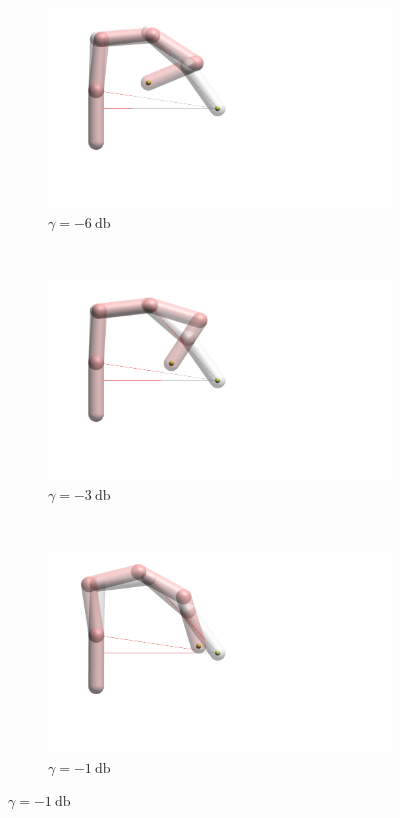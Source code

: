 \begin{figure}[h]
    \centering
    \begin{subfigure}[b]{.3\textwidth}
        \includegraphics[width=\textwidth]{Figures/distortions/distortions-6.png}
        \caption{$\gamma = \SI{-6}{\decibel}$}
    \end{subfigure}
    ~
    \begin{subfigure}[b]{.3\textwidth}
        \includegraphics[width=\textwidth]{Figures/distortions/distortions-3.png}
        \caption{$\gamma = \SI{-3}{\decibel}$}
    \end{subfigure}
    ~
    \begin{subfigure}[b]{.3\textwidth}
        \includegraphics[width=\textwidth]{Figures/distortions/distortions-1.png}
        \caption{$\gamma = \SI{-1}{\decibel}$}
    \end{subfigure}



\end{figure}
